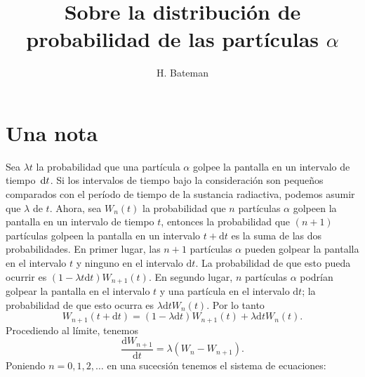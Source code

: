 \documentclass[10pt,twoside=false,twocolumn=false,BCOR=12mm,DIV=calc]{scrartcl} %
\theoremstyle{definition}
\begin{document}
\begin{titlepage}
  \extratitle{\textbf{\LARGE Traducción del artículo\\[\baselineskip] \textit{Las variaciones de la probabilidad en la distribución de partículas $\alpha$}}}
  \title{Sobre la distribución de probabilidad de las partículas $\alpha$}
  \author{H. Bateman}
  \begin{spacing}{1}
    \maketitle
  \end{spacing}
  \thispagestyle{empty}
\end{titlepage}

\tableofcontents
\newpage
\section{Una nota}
\label{sec:note}


Sea $\lambda t$ la probabilidad que una partícula $\alpha$ golpee la pantalla en un intervalo de tiempo $\dl t$. Si los intervalos de tiempo bajo la consideración son pequeños comparados con el período de tiempo de la sustancia radiactiva, podemos asumir que $\lambda$ de $t$. Ahora, sea $W_n(t)$ la probabilidad que $n$ partículas $\alpha$ golpeen la pantalla en un intervalo de tiempo $t$, entonces la probabilidad que $(n+1)$ partículas golpeen la pantalla en un intervalo $t+\mathrm{d}t$ es la suma de las dos probabilidades. En primer lugar, las $n+1$ partículas $\alpha$ pueden golpear la pantalla en el intervalo $t$ y ninguno en el intervalo $\mathrm{d}t$. La probabilidad de que esto pueda ocurrir es $(1-\lambda t\mathrm{d}t)W_{n+1}(t)$. En segundo lugar, $n$ partículas $\alpha$ podrían golpear la pantalla en el intervalo $t$ y una partícula en el intervalo $\mathrm{d}t$; la probabilidad de que esto ocurra es $\lambda\mathrm{d}t W_n(t)$. Por lo tanto
\begin{equation*}
  W_{n+1}\left(t+\mathrm{d}t\right)=\left(1-\lambda\mathrm{d}t\right)W_{n+1}(t)+\lambda\mathrm{d}t W_n\left(t\right).
\end{equation*}
Procediendo al límite, tenemos
\begin{equation*}
  \frac{\mathrm{d}W_{n+1}}{\mathrm{d}t}=\lambda\left(W_n-W_{n+1}\right).
\end{equation*}
Poniendo $n=0,1,2,\ldots$ en una sucecsión tenemos el sistema de ecuaciones:
\newpage
\end{document}
